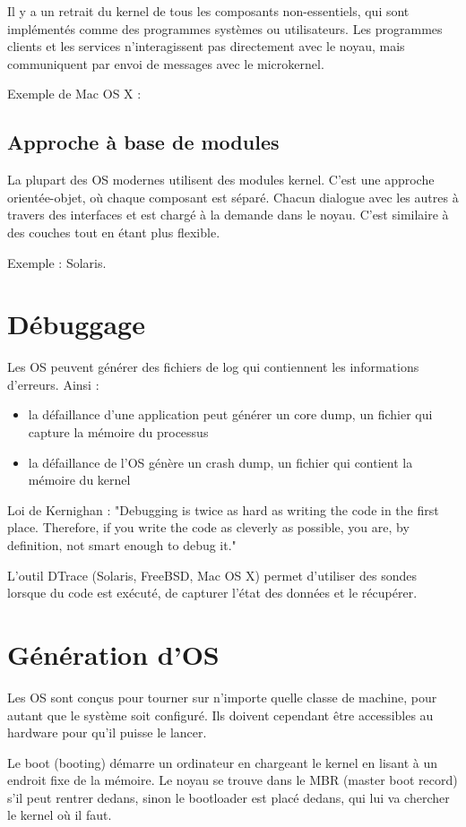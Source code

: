 	Il y a un retrait du kernel de tous les composants non-essentiels, qui sont implémentés comme des programmes systèmes ou utilisateurs. Les programmes clients et les services n'interagissent pas directement avec le noyau, mais communiquent par envoi de messages avec le microkernel.
	
	Exemple de Mac OS X :
	
	
	\subsection{Approche à base de modules}
	
	La plupart des OS modernes utilisent des modules kernel. C'est une approche orientée-objet, où chaque composant est séparé. Chacun dialogue avec les autres à travers des interfaces et est chargé à la demande dans le noyau. C'est similaire à des couches tout en étant plus flexible.
	
	Exemple : Solaris.
	
\section{Débuggage}

Les OS peuvent générer des fichiers de log qui contiennent les informations d'erreurs. Ainsi :

\begin{itemize}
	\item la défaillance d'une application peut générer un core dump, un fichier qui capture la mémoire du processus
	\item la défaillance de l'OS génère un crash dump, un fichier qui contient la mémoire du kernel
\end{itemize}

Loi de Kernighan : "Debugging is twice as hard as writing the code in the first place. Therefore, if you write the code as cleverly as possible, you are, by definition, not smart enough to debug it."

L'outil DTrace (Solaris, FreeBSD, Mac OS X) permet d'utiliser des sondes lorsque du code est exécuté, de capturer l'état des données et le récupérer.


\section{Génération d'OS}

Les OS sont conçus pour tourner sur n'importe quelle classe de machine, pour autant que le système soit configuré. Ils doivent cependant être accessibles au hardware pour qu'il puisse le lancer.

Le boot (booting) démarre un ordinateur en chargeant le kernel en lisant à un endroit fixe de la mémoire. Le noyau se trouve dans le MBR (master boot record) s'il peut rentrer dedans, sinon le bootloader est placé dedans, qui lui va chercher le kernel où il faut.


